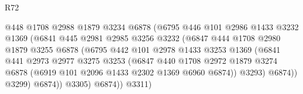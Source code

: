 \begin{lexlean}{R72}
\begin{coremodule}
                                    @448
                                    @1708
                                    @2988
                                    @1879
                                    @3234
                                    @6878
                                    (@6795
                                      @446
                                      @101
                                      @2986
                                      @1433
                                      @3232
                                      @1369
                                      (@6841
                                        @445
                                        @2981
                                        @2985
                                        @3256
                                        @3232
                                        (@6847
                                          @444
                                          @1708
                                          @2980
                                          @1879
                                          @3255
                                          @6878
                                          (@6795
                                            @442
                                            @101
                                            @2978
                                            @1433
                                            @3253
                                            @1369
                                            (@6841
                                              @441
                                              @2973
                                              @2977
                                              @3275
                                              @3253
                                              (@6847
                                                @440
                                                @1708
                                                @2972
                                                @1879
                                                @3274
                                                @6878
                                                (@6919 @101 @2096 @1433 @2302 @1369 @6960 @6874))
                                              @3293)
                                            @6874))
                                        @3299)
                                      @6874))
                                  @3305)
                                @6874))
                            @3311)

\end{coremodule}
\end{lexlean}
